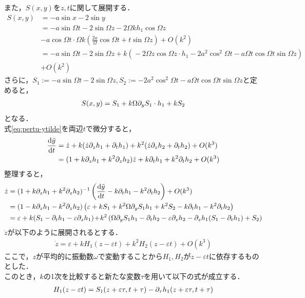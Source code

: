 \documentclass[../main]{subfiles}
\begin{document}
    また，$S(x,y)$を$z,t$に関して展開する．
    \begin{align*}
        S(x,y)&=-a\sin x-2\sin y\\
        &=-a\sin\Omega t-2\sin \Omega z-2\Omega kh_1\cos\Omega z\\
        &-a\cos\Omega t\cdot \Omega k\left(\frac{2a}{\Omega}\cos \Omega t+t\sin \Omega z\right)+O(k^2)\\
        &=-a\sin\Omega t-\!2\sin \Omega z       +k\left(\!-2\Omega z \cos\Omega z\cdot h_1-\!2a^2\cos^2\Omega t-\!a\Omega t\cos \Omega  t\sin \Omega z\right)\\
        &+O(k^2)
    \end{align*}
    さらに，$S_1:=-a\sin\Omega t-2\sin\Omega z,S_2:=-2a^2\cos^2\Omega t-a\Omega t\cos \Omega t\sin \Omega z$と定めると，
    \begin{align*}
        S(x,y)=S_1+k\Omega\partial_y S_1\cdot h_1+kS_2
    \end{align*}
    となる．\\
    式\eqref{eq:pertu-ytilde}を両辺$t$で微分すると，
    \begin{align*}
        \dv{\tilde{y}}{t}&=\dot{z}+k(\dot{z}\partial_zh_1+\partial_th_1)+k^2(\dot{z}\partial_zh_2+\partial_th_2)+O(k^3)\\
        &=(1+k\partial_zh_1+k^2\partial_zh_2)\dot{z}+k\partial_th_1+k^2\partial_th_2+O(k^3)
    \end{align*}
    整理すると，
    \begin{align*}
        \dot{z}&=(1+k\partial_zh_1+k^2\partial_zh_2)^{-1}\left( \dv{\tilde{y}}{t}-k\partial_th_1-k^2\partial_th_2 \right)+O(k^3)\\
        &=(1-k\partial_zh_1-k^2\partial_zh_2)\left(\varepsilon+kS_1+k^2\Omega \partial_y S_1h_1+k^2S_2-k\partial_th_1-k^2\partial_th_2 \right)\\
        &=\varepsilon+k(S_1-\partial_th_1-\varepsilon\partial_zh_1)\!+\!k^2\left(\Omega \partial_y S_1h_1 -\partial_th_2-\varepsilon\partial_zh_2 -\partial_zh_1(S_1-\partial_th_1)+S_2\right)
    \end{align*}
    $\dot{z}$が以下のように展開されるとする．
    \begin{align*}
        \dot{z}=\varepsilon+kH_1(z-\varepsilon t)+k^2H_2(z-\varepsilon t)+O(k^3)
    \end{align*}
    ここで，$z$が平均的に振動数$\omega$で変動することから$H_1,H_2$が$z-\varepsilon t$に依存するものとした．\\
    このとき，$k$の1次を比較すると新たな変数$\tau$を用いて以下の式が成立する．
    \begin{align*}
        H_1(z-\varepsilon t)=S_1(z+\varepsilon\tau,t+\tau)-\partial_\tau h_1(z+\varepsilon\tau,t+\tau)
    \end{align*}
\end{document}
